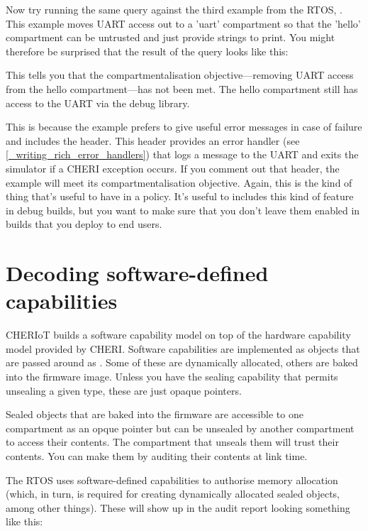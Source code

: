 {Now try running the same query against the third example from the RTOS, .
This example moves UART access out to a 'uart' compartment so that the 'hello' compartment can be untrusted and just provide strings to print.
You might therefore be surprised that the result of the query looks like this:

\begin{jsonsnippet}
\end{jsonsnippet}

This tells you that the compartmentalisation objective—removing UART access from the hello compartment—has not been met.
The hello compartment still has access to the UART via the debug library.

This is because the example prefers to give useful error messages in case of failure and includes the  header.
This header provides an error handler (see \ref{_writing_rich_error_handlers}) that logs a message to the UART and exits the simulator if a CHERI exception occurs.
If you comment out that header, the example will meet its compartmentalisation objective.
Again, this is the kind of thing that's useful to have in a policy.
It's useful to includes this kind of feature in debug builds, but you want to make sure that you don't leave them enabled in builds that you deploy to end users.

\section{Decoding software-defined capabilities}

CHERIoT builds a software capability model on top of the hardware capability model provided by CHERI.
Software capabilities are implemented as objects that are passed around as .
Some of these are dynamically allocated, others are baked into the firmware image.
Unless you have the sealing capability that permits unsealing a given type, these are just opaque pointers.

Sealed objects that are baked into the firmware are accessible to one compartment as an opque pointer but can be unsealed by another compartment to access their contents.
The compartment that unseals them will trust their contents.
You can make them  by auditing their contents at link time.

The RTOS uses software-defined capabilities to authorise memory allocation (which, in turn, is required for creating dynamically allocated sealed objects, among other things).
These will show up in the audit report looking something like this:

}
